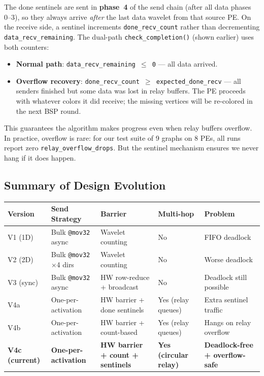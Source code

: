 \documentclass[11pt,letterpaper]{article}
\begin{document}
The done sentinels are sent in \textbf{phase~4} of the send chain (after all data phases 0--3), so they always arrive \emph{after} the last data wavelet from that source PE. On the receive side, a sentinel increments \texttt{done\_recv\_count} rather than decrementing \texttt{data\_recv\_remaining}. The dual-path \texttt{check\_completion()} (shown earlier) uses both counters:

\begin{itemize}[nosep]
  \item \textbf{Normal path}: \texttt{data\_recv\_remaining $\leq$ 0} --- all data arrived.
  \item \textbf{Overflow recovery}: \texttt{done\_recv\_count $\geq$ expected\_done\_recv} --- all senders finished but some data was lost in relay buffers. The PE proceeds with whatever colors it did receive; the missing vertices will be re-colored in the next BSP round.
\end{itemize}

This guarantees the algorithm makes progress even when relay buffers overflow. In practice, overflow is rare: for our test suite of 9 graphs on 8 PEs, all runs report zero \texttt{relay\_overflow\_drops}. But the sentinel mechanism ensures we never hang if it does happen.

\subsection{Summary of Design Evolution}

\begin{center}
\renewcommand{\arraystretch}{1.3}
\begin{tabular}{p{42pt}p{85pt}p{70pt}p{70pt}p{80pt}}
\toprule
\textbf{Version} & \textbf{Send Strategy} & \textbf{Barrier} & \textbf{Multi-hop} & \textbf{Problem} \\
\midrule
V1 (1D) & Bulk \texttt{@mov32} async & Wavelet counting & No & FIFO deadlock \\
V2 (2D) & Bulk \texttt{@mov32} $\times$4 dirs & Wavelet counting & No & Worse deadlock \\
V3 (sync) & Bulk \texttt{@mov32} async & HW row-reduce + broadcast & No & Deadlock still possible \\
V4a & One-per-activation & HW barrier + done sentinels & Yes (relay queues) & Extra sentinel traffic \\
V4b & One-per-activation & HW barrier + count-based & Yes (relay queues) & Hangs on relay overflow \\
\textbf{V4c (current)} & \textbf{One-per-activation} & \textbf{HW barrier + count + sentinels} & \textbf{Yes (circular relay)} & \textbf{Deadlock-free + overflow-safe} \\
\bottomrule
\end{tabular}
\end{center}
\end{document}
